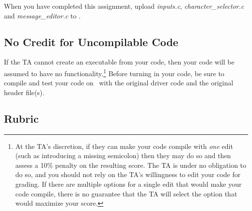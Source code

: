 When you have completed this assignment, upload \textit{inputs.c}, \textit{character\_selector.c} and \textit{message\_editor.c} to
\filesubmission.

\subsection*{No Credit for Uncompilable Code}
If the TA cannot create an executable from your code, then your code will be assumed to have no functionality.\footnote{
    At the TA's discretion, if they can make your code compile with \textit{one} edit (such as introducing a missing semicolon) then they may do so and then assess a 10\% penalty on the resulting score.
    The TA is under no obligation to do so, and you should not rely on the TA's willingness to edit your code for grading.
    If there are multiple options for a single edit that would make your code compile, there is no guarantee that the TA will select the option that would maximize your score.
}
Before turning in your code, be sure to compile and test your code on \runtimeenvironment\ with the original driver code and the original header file(s).

\interruptlablatepolicy

\subsection*{Rubric}

